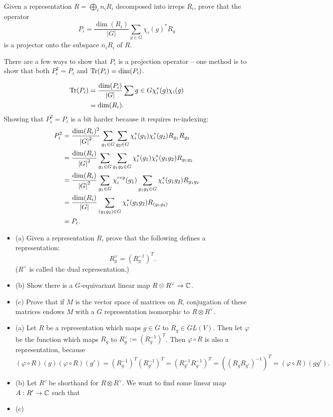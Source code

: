 \documentclass{article}
\begin{document}
\bigskip
\begin{prob}
    Given a representation $R = \bigoplus_i n_iR_i$ decomposed into irreps $R_i$, prove that the operator
    \[ P_i = \frac{\dim(R_i)}{|G|} \sum_{g \in G} \chi_i(g)^*R_g \]
    is a projector onto the subspace $n_iR_i$ of $R$.
\end{prob}
There are a few ways to show that $P_i$ is a projection operator -- one method is to show that both $P_i^2=P_i$ and $\operatorname{Tr}(P_i) = \dim(P_i)$.
\par
\begin{align*}
    \operatorname{Tr}(P_i) &= \frac{\dim(P_i)}{|G|} \sum{g \in G} \chi_i^*(g) \chi_i(g) \\
             &= \dim(R_i).
\end{align*}
Showing that $P_i^2=P_i$ is a bit harder because it requires re-indexing:
\begin{align*}
    P_i^2 &= \frac{\dim(R_i)^2}{\left\lvert G \right\rvert^2} \sum_{g_1 \in G} \sum_{g_2 \in G} \chi_i^*(g_1) \chi_i^*(g_2) R_{g_1} R_{g_2} \\
          &= \frac{\dim(R_i)}{\left\lvert G \right\rvert^2} \sum_{g_1 \in G} \sum_{g_1g_2 \in G} \chi_i^*(g_1) \chi_i^*(g_1g_2) R_{g_1g_2} \\
          &= \frac{\dim(R_i)}{\left\lvert G \right\rvert^2} \sum_{g_1 \in G} \chi_i^{reg}(g_1) \sum_{g_1g_2 \in G} \chi_i^*(g_1g_2) R_{g_1g_2} \\
          &= \frac{\dim(R_i)}{\left\lvert G \right\rvert} \sum_{(g_1g_2) \in G} \chi_i^*(g_1g_2) R_{(g_1g_2)} \\
          &= P_i.
\end{align*}

\bigskip
\begin{prob}
    \begin{itemize}
        \item (a) Given a representation $R$, prove that the following defines a representation:
            \[ R_g^\vee = \left( R_g^{-1} \right)^T. \]
            ($R^\vee$ is called the dual representation.)
        \item (b) Show there is a $G$-equivariant linear map $R \otimes R^\vee \rightarrow \mathbb{C}$.
        \item (c) Prove that if $M$ is the vector space of matrices on $R$, conjugation of these matrices endows $M$ with a $G$ representation isomorphic to $R \otimes R^\vee$.
    \end{itemize}
\end{prob}
\begin{itemize}
    \item (a) Let $R$ be a representation which maps $g \in G$ to $R_g \in GL(V)$. Then let $\varphi$ be the function which maps $R_g$ to $R_g^\vee := (R_g^{-1})^T$. Then $\varphi \circ R$ is also a representation, because
        \[ (\varphi \circ R)(g) (\varphi \circ R) (g') = (R_g^{-1})^T (R_{g'}^{-1})^T = (R_{g'}^{-1}R_g^{-1})^T = ((R_gR_{g'})^{-1})^T = (\varphi \circ R)(gg'). \]
    \item (b) Let $R'$ be shorthand for $R \otimes R^\vee$. We want to find some linear map $A: R' \rightarrow \mathbb{C}$ such that 
    \item (c)
\end{itemize}
\end{document}
